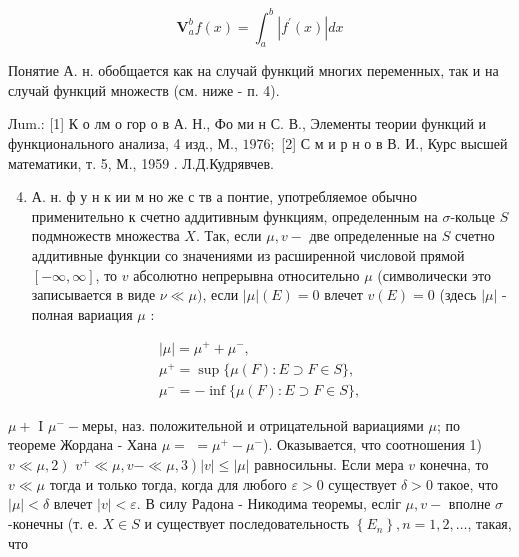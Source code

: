 \documentclass[10pt]{article}
\begin{document}
\[

\mathbf{V}_{a}^{b} f(x)=\int_{a}^{b}\left|f^{\prime}(x)\right| d x

\]



Понятие А. н. обобщается как на случай функций многих переменных, так и на случай функций множеств (см. ниже - п. 4).



Лum.: [1] К о лм о гор о в А. Н., Фо ми н С. В., Элементы теории функций и функционального анализа, 4 изд., М., $1976 ;$ [2] С м и р н о в В. И., Курс высшей математики, т. 5, М., 1959 . Л.Д.Кудрявчев.



\begin{enumerate}

  \setcounter{enumi}{3}

  \item А. н. ф у н к ии м но же с тв а понтие, употребляемое обычно применительно к счетно аддитивным функциям, определенным на $\sigma$-кольце $S$ подмножеств множества $X$. Так, если $\mu, v-$ две определенные на $S$ счетно аддитивные функции со значениями из расширенной числовой прямой $[-\infty, \infty]$, то $v$ абсолютно непрерывна относительно $\mu$ (символически это записывается в виде $\nu \ll \mu)$, если $|\mu|(E)=0$ влечет $v(E)=0$ (здесь $|\mu|$ - полная вариация $\mu$ :

\end{enumerate}



\[

\begin{gathered}

|\mu|=\mu^{+}+\mu^{-}, \\

\mu^{+}=\sup \{\mu(F): E \supset F \in S\}, \\

\mu^{-}=-\inf \{\mu(F): E \supset F \in S\},

\end{gathered}

\]



$\mu+$ I $\mu^{-}-$меры, наз. положительной и отрицательной вариациями $\mu$; по теореме Жордана - Хана $\mu=$ $=\mu^{+}-\mu^{-}$). Оказывается, что соотношения 1) $\left.v \ll \mu, 2\right)$ $\left.v^{+} \ll \mu, v-\ll \mu, 3\right)|v| \leqslant|\mu|$ равносильны. Если мера $v$ конечна, то $v \ll \mu$ тогда и только тогда, когда для любого $\varepsilon>0$ существует $\delta>0$ такое, что $|\mu|<\delta$ влечет $|v|<\varepsilon$. В силу Радона - Никодима теоремы, есліг $\mu, v-$ вполне $\sigma$-конечны (т. е. $X \in S$ и существует последовательность $\left\{E_{n}\right\}, n=1,2, \ldots$, такая, что
\end{document}

